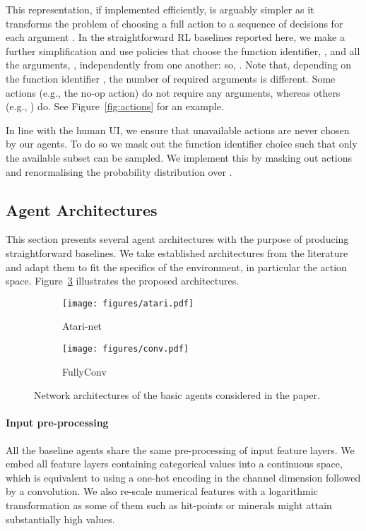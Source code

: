 \documentclass{article}
\begin{document}
This representation, if implemented efficiently, is arguably simpler as it transforms the problem of choosing a full action  to a sequence of decisions for each argument . 
In the straightforward RL baselines reported here, we make a further simplification and use policies that choose the function identifier, , and all the arguments, , independently from one another: so, . Note that, depending on the function identifier , the number of required arguments  is different. Some actions (e.g., the no-op action) do not require any arguments, whereas others (e.g., ) do. 
See Figure~\ref{fig:actions} for an example.

In line with the human UI, we ensure that unavailable actions are never chosen by our agents. To do so we mask out the function identifier choice  such that only the available subset can be sampled. We implement this by masking out actions and renormalising the probability distribution over . 

\subsection{Agent Architectures}

This section presents several agent architectures with the purpose of producing straightforward baselines. 
We take established architectures from the literature \cite{mnih2015human, mnih2016asynchronous} and adapt them to fit the specifics of the environment, in particular the action space.
Figure~\ref{fig:networks} illustrates the proposed architectures.

\begin{figure}[ht]
\centering
        \begin{subfigure}[b]{0.46\textwidth}
                \texttt{[image: figures/atari.pdf]}
                \caption{Atari-net}
                \label{fig:atari_net}
        \end{subfigure}\quad \quad
        \begin{subfigure}[b]{0.48\textwidth}
                \texttt{[image: figures/conv.pdf]}
                \caption{FullyConv}
                \label{fig:conv_net}
        \end{subfigure}\caption{Network architectures of the basic agents considered in the paper.
        }
        \label{fig:networks}
\end{figure}

\paragraph{Input pre-processing} All the baseline agents share the same pre-processing of input feature layers.
We embed all feature layers containing categorical values into a continuous space, which is equivalent to using a one-hot encoding in the channel dimension followed by a  convolution.
We also re-scale numerical features with a logarithmic transformation as some of them such as hit-points or minerals might attain substantially high values.
\end{document}
